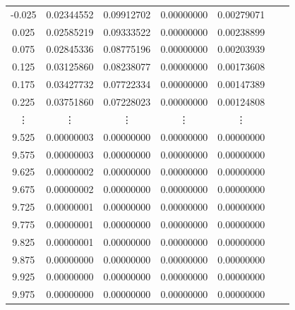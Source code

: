 \documentclass[a4j, titlepage]{jsarticle}
\numberwithin{equation}{section}
\begin{document}
\begin{table}[h]
\begin{tabular}{ccccccc}
                    -0.025 & 0.02344552 & 0.09912702 & 0.00000000 & 0.00279071 \\
                    0.025 & 0.02585219 & 0.09333522 & 0.00000000 & 0.00238899 \\
                    0.075 & 0.02845336 & 0.08775196 & 0.00000000 & 0.00203939 \\
                    0.125 & 0.03125860 & 0.08238077 & 0.00000000 & 0.00173608 \\
                    0.175 & 0.03427732 & 0.07722334 & 0.00000000 & 0.00147389 \\
                    0.225 & 0.03751860 & 0.07228023 & 0.00000000 & 0.00124808 \\
                    \vdots & \vdots & \vdots & \vdots & \vdots \vspace{1mm} \\
                    9.525 & 0.00000003 & 0.00000000 & 0.00000000 & 0.00000000 \\
                    9.575 & 0.00000003 & 0.00000000 & 0.00000000 & 0.00000000 \\
                    9.625 & 0.00000002 & 0.00000000 & 0.00000000 & 0.00000000 \\
                    9.675 & 0.00000002 & 0.00000000 & 0.00000000 & 0.00000000 \\
                    9.725 & 0.00000001 & 0.00000000 & 0.00000000 & 0.00000000 \\
                    9.775 & 0.00000001 & 0.00000000 & 0.00000000 & 0.00000000 \\
                    9.825 & 0.00000001 & 0.00000000 & 0.00000000 & 0.00000000 \\
                    9.875 & 0.00000000 & 0.00000000 & 0.00000000 & 0.00000000 \\
                    9.925 & 0.00000000 & 0.00000000 & 0.00000000 & 0.00000000 \\
                    9.975 & 0.00000000 & 0.00000000 & 0.00000000 & 0.00000000 \\
                    \hline
                \end{tabular}
            \end{table}
\end{document}
